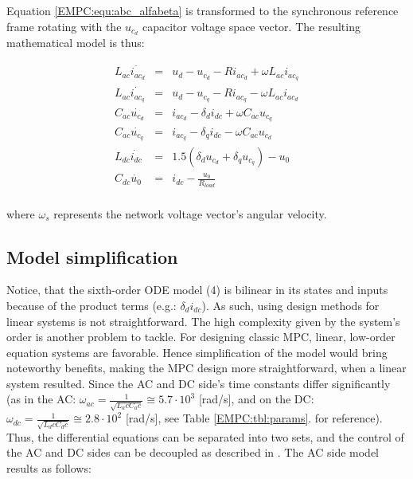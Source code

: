    Equation \ref{EMPC:equ:abc_alfabeta} is transformed to the synchronous reference frame rotating with the $u_{c_d}$ capacitor voltage space vector. The resulting mathematical model is thus:

    \begin{equation}
        \begin{array}{rcl}
            L_{ac}\dot{i_{ac_d}}&=&u_d-u_{c_d}-Ri_{ac_d}+\omega L_{ac}i_{ac_q}\\
            L_{ac}\dot{i_{ac_q}}&=&u_d-u_{c_q}-Ri_{ac_q}-\omega L_{ac}i_{ac_d}\\
            C_{ac}\dot{u_{c_d}}&=&i_{ac_d}-\delta_di_{dc}+\omega C_{ac}u_{c_q}\\
            C_{ac}\dot{u_{c_q}}&=&i_{ac_q}-\delta_qi_{dc}-\omega C_{ac}u_{c_d}\\
            L_{dc}\dot{i_{dc}}&=&1.5(\delta_d u_{c_d}+\delta_q u_{c_q})-u_0\\
            C_{dc}\dot{u_0}&=&i_{dc}-\frac{u_0}{R_{load}}\\
        \end{array}
        \label{EMPC:equ:abc_dq}
    \end{equation}

    where $\omega_s$ represents the network voltage vector’s angular velocity.

    \subsection{Model simplification}\label{EMPC:sec:Simplification}

    Notice, that the sixth-order ODE model (4) is bilinear in its states and
    inputs because of the product terms (e.g.: $\delta_di_{dc}$). As such, using design methods for linear systems is not straightforward. The high complexity given by the system’s order is another problem to tackle. For designing classic MPC, linear, low-order equation systems are favorable. Hence simplification of the model would bring noteworthy benefits, making the MPC design more straightforward, when a linear system resulted.
    Since the AC and DC side’s time constants differ significantly (as in the AC: $\omega_{ac}=\frac{1}{\sqrt{L_ac C_ac}}\cong5.7\cdot10^3$ [rad/s], and on the DC: $\omega_{dc}=\frac{1}{\sqrt{L_dc C_dc}}\cong2.8\cdot10^2$ [rad/s], see Table \ref{EMPC:tbl:params}. for reference). Thus, the differential equations can be separated into two sets, and the control of the AC and DC sides can be decoupled as described in \cite{ahmed2014model}. The AC side model results as follows:


